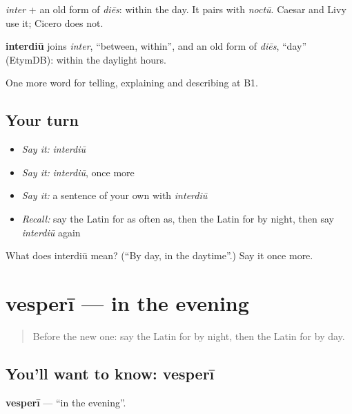 \emph{inter} + an old form of \emph{diēs}: within the day. It pairs with \emph{noctū}. Caesar and Livy use it; Cicero does not.

\begin{cousinweb}
\textbf{interdiū} joins \emph{inter}, \textquotedblleft{}between, within\textquotedblright{}, and an old form of \emph{diēs}, \textquotedblleft{}day\textquotedblright{} (EtymDB): within the daylight hours.
\end{cousinweb}

\begin{grammarlens}[title={What you've built}]
One more word for telling, explaining and describing at B1.
\end{grammarlens}

\subsection*{Your turn}
\begin{itemize}
\raggedright
  \item \emph{Say it:} \emph{interdiū}
  \item \emph{Say it:} \emph{interdiū}, once more
  \item \emph{Say it:} a sentence of your own with \emph{interdiū}
  \item \emph{Recall:} say the Latin for as often as, then the Latin for by night, then say \emph{interdiū} again
\end{itemize}

\begin{tcolorbox}[breakable,colback=teal!4,colframe=teal!35!black,title={Before you move on}]
What does interdiū mean? (\textquotedblleft{}By day, in the daytime\textquotedblright{}.) Say it once more.
\end{tcolorbox}
\section[vesperī]{vesperī — in the evening}

\label{lesson:LA-C295-vesperi}



\begin{quote}
Before the new one: say the Latin for by night, then the Latin for by day.
\end{quote}

\subsection*{You'll want to know: vesperī}
\textbf{vesperī} — \textquotedblleft{}in the evening\textquotedblright{}.

